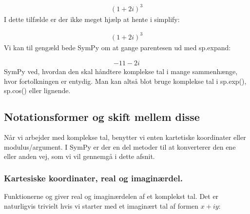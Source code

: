 \documentclass[letterpaper,10pt,english]{jupyterBook}
\begin{document}
\begin{sphinxVerbatim}[commandchars=\\\{\}]
  
\end{sphinxVerbatim}
\begin{equation*}
\begin{split}\displaystyle \left(1 + 2 i\right)^{3}\end{split}
\end{equation*}
I dette tilfælde er der ikke meget hjælp at hente i simplify:

\begin{sphinxVerbatim}[commandchars=\\\{\}]
  
\end{sphinxVerbatim}
\begin{equation*}
\begin{split}\displaystyle \left(1 + 2 i\right)^{3}\end{split}
\end{equation*}
Vi kan til gengæld bede SymPy om at gange parentesen ud med sp.expand:

\begin{sphinxVerbatim}[commandchars=\\\{\}]
  
\end{sphinxVerbatim}
\begin{equation*}
\begin{split}\displaystyle -11 - 2 i\end{split}
\end{equation*}
SymPy ved, hvordan den skal håndtere komplekse tal i mange sammenhænge, hvor fortolkningen er entydig. Man kan altså blot bruge komplekse tal i sp.exp(), sp.cos() eller lignende.


\subsection{Notationsformer og skift mellem disse}
\label{\detokenize{notebooks/sympy/Notebook_kompleks:notationsformer-og-skift-mellem-disse}}
Når vi arbejder med komplekse tal, benytter vi enten kartetiske koordinater eller modulus/argument. I SymPy er der en del metoder til at konverterer den ene eller anden vej, som vi vil gennemgå i dette afsnit.


\subsubsection{Kartesiske koordinater, real og imaginærdel.}
\label{\detokenize{notebooks/sympy/Notebook_kompleks:kartesiske-koordinater-real-og-imaginaerdel}}
Funktionerne  og  giver real\sphinxhyphen{} og imaginærdelen af et komplekst tal. Det er naturligvis trivielt hvis vi starter med et imaginært tal af formen \(x + iy\):
\end{document}
